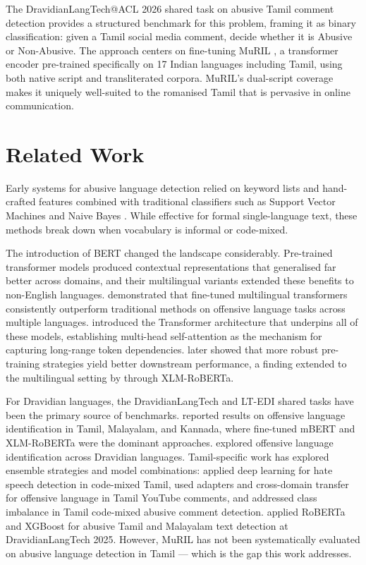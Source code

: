 \documentclass[11pt]{article}
\begin{document}
The DravidianLangTech@ACL 2026 shared task
on abusive Tamil comment detection \cite{sivagnanam2026} provides a structured benchmark for this problem, framing it as binary classification: given a Tamil social media comment, decide whether it is Abusive or Non-Abusive. The approach centers on
fine-tuning MuRIL \cite{khanuja2021}, a transformer encoder pre-trained specifically on 17 Indian languages including Tamil, using both native script and transliterated corpora. MuRIL's dual-script coverage makes
it uniquely well-suited to the romanised Tamil that
is pervasive in online communication.

\section{Related Work}

Early systems for abusive language detection relied
on keyword lists and hand-crafted features combined with traditional classifiers such as Support
Vector Machines and Naive Bayes \cite{nobata2016}. While effective for formal single-language text, these methods
break down when vocabulary is informal or code-mixed.

The introduction of BERT \cite{devlin2019} changed the landscape considerably. Pre-trained transformer models produced contextual representations that generalised far better across domains, and their multilingual variants extended these benefits to non-English languages. \citet{ranasinghe2021} demonstrated that fine-tuned multilingual transformers consistently outperform traditional methods on offensive language tasks across multiple
languages. \citet{vaswani2017} introduced the Transformer architecture that underpins all of these models, establishing multi-head self-attention as the
mechanism for capturing long-range token dependencies. \citet{liu2019} later showed that more robust pre-training strategies yield better downstream
performance, a finding extended to the multilingual setting by \citet{conneau2020} through XLM-RoBERTa.

For Dravidian languages, the DravidianLangTech and LT-EDI shared tasks have been the
primary source of benchmarks. \citet{chakravarthi2021} reported results on offensive language identification in Tamil, Malayalam, and Kannada, where
fine-tuned mBERT and XLM-RoBERTa were the
dominant approaches. \citet{saisharma2021} explored offensive language identification across Dravidian languages. Tamil-specific work has explored
ensemble strategies and model combinations: \citet{anbukkarasi2023} applied deep
learning for hate speech detection in code-mixed
Tamil, \citet{subramanian2022} used adapters and
cross-domain transfer for offensive language in
Tamil YouTube comments, and \citet{krishna2024} addressed class imbalance in Tamil code-mixed
abusive comment detection. \citet{nishanth2025} applied
RoBERTa and XGBoost for abusive Tamil and
Malayalam text detection at DravidianLangTech
2025. However, MuRIL has not been systematically evaluated on abusive language detection in
Tamil --- which is the gap this work addresses.
\end{document}
